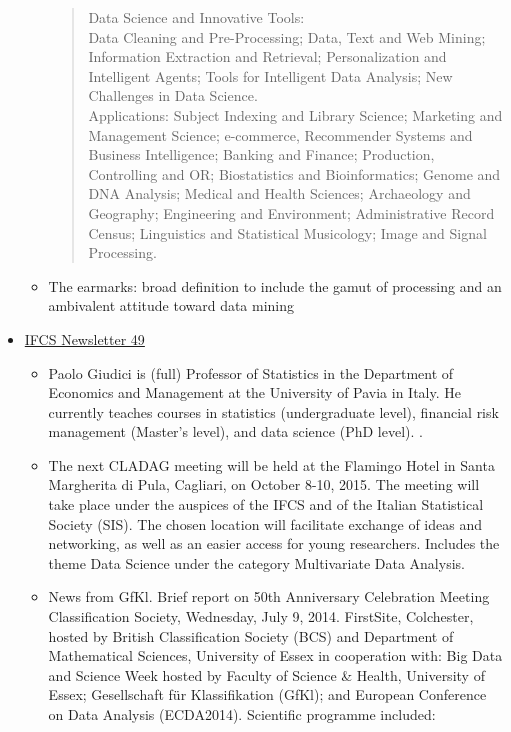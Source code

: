 \documentclass[
  letterpaper,
]{report}
\providecommand{\tightlist}{%
  \setlength{\itemsep}{0pt}\setlength{\parskip}{0pt}}\usepackage{longtable,booktabs,array}
\begin{document}
\begin{itemize}
\begin{itemize}
    \begin{quote}
    Data Science and Innovative Tools:\\
    Data Cleaning and Pre-Processing; Data, Text and Web Mining;
    Information Extraction and Retrieval; Personalization and
    Intelligent Agents; Tools for Intelligent Data Analysis; New
    Challenges in Data Science.\\
    Applications: Subject Indexing and Library Science; Marketing and
    Management Science; e-commerce, Recommender Systems and Business
    Intelligence; Banking and Finance; Production, Controlling and OR;
    Biostatistics and Bioinformatics; Genome and DNA Analysis; Medical
    and Health Sciences; Archaeology and Geography; Engineering and
    Environment; Administrative Record Census; Linguistics and
    Statistical Musicology; Image and Signal Processing.
    \end{quote}
  \item
    The earmarks: broad definition to include the gamut of processing
    and an ambivalent attitude toward data mining
  \end{itemize}
\item
  \href{https://ifcs.boku.ac.at/site/lib/exe/fetch.php?media=newsletter_archive:ifcs-newsletter-49.pdf}{IFCS
  Newsletter 49}

  \begin{itemize}
  \tightlist
  \item
    Paolo Giudici is (full) Professor of Statistics in the Department of
    Economics and Management at the University of Pavia in Italy. He
    currently teaches courses in statistics (undergraduate level),
    financial risk management (Master's level), and data science (PhD
    level). .
  \item
    The next CLADAG meeting will be held at the Flamingo Hotel in Santa
    Margherita di Pula, Cagliari, on October 8-10, 2015. The meeting
    will take place under the auspices of the IFCS and of the Italian
    Statistical Society (SIS). The chosen location will facilitate
    exchange of ideas and networking, as well as an easier access for
    young researchers. Includes the theme Data Science under the
    category Multivariate Data Analysis.
  \item
    News from GfKl. Brief report on 50th Anniversary Celebration Meeting
    Classification Society, Wednesday, July 9, 2014. FirstSite,
    Colchester, hosted by British Classification Society (BCS) and
    Department of Mathematical Sciences, University of Essex in
    cooperation with: Big Data and Science Week hosted by Faculty of
    Science \& Health, University of Essex; Gesellschaft für
    Klassifikation (GfKl); and European Conference on Data Analysis
    (ECDA2014). Scientific programme included:


\end{itemize}
\end{itemize}
\end{document}
